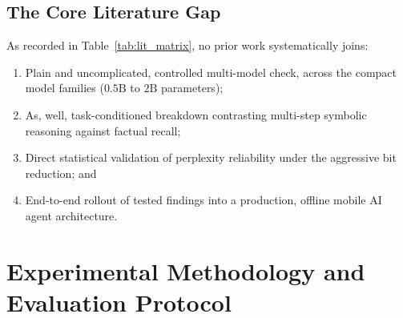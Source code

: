 \documentclass[12pt,a4paper,oneside]{report}
\begin{document}
    \section{The Core Literature Gap}
    As recorded in Table~\ref{tab:lit_matrix}, no prior work systematically joins:
    \begin{enumerate}
        \item Plain and uncomplicated, controlled multi-model check, across the compact model families ($0.5\text{B}$ to $2\text{B}$ parameters);
        \item As, well, task-conditioned breakdown contrasting multi-step symbolic reasoning against factual recall;
        \item Direct statistical validation of perplexity reliability under the aggressive bit reduction; and
        \item End-to-end rollout of tested findings into a production, offline mobile AI agent architecture.

    \end{enumerate}

    \chapter{Experimental Methodology and Evaluation Protocol}
\end{document}
